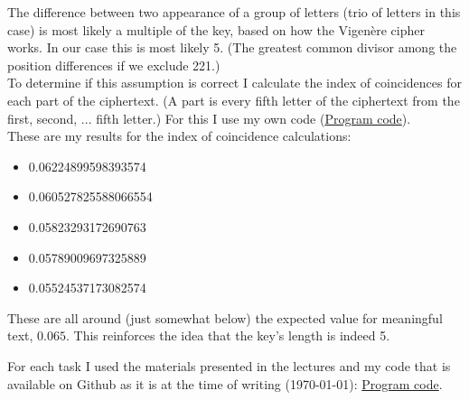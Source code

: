 \documentclass{article}
\begin{document}
\begin{enumerate}[label={}]
\begin{itemize}
		\end{itemize}
		The difference between two appearance of a group of letters (trio of letters in this case) is most likely a multiple of the key, based on how the Vigenère cipher works. In our case this is most likely 5. (The greatest common divisor among the position differences if we exclude 221.)\\
		To determine if this assumption is correct I calculate the index of coincidences for each part of the ciphertext. (A part is every fifth letter of the ciphertext from the first, second, ... fifth letter.) For this I use my own code (\hyperlink{https://github.com/halkszavu/Encryption-Homework-2025/blob/main/Code/Homework-Calculations/Homework-Calculations/Program.cs}{Program code}).\\
		These are my results for the index of coincidence calculations:
		\begin{itemize}		
			 \item  0.06224899598393574
			 \item  0.060527825588066554
			 \item  0.05823293172690763
			 \item  0.05789009697325889
			 \item  0.05524537173082574
		\end{itemize}
		These are all around (just somewhat below) the expected value for meaningful text, $0.065$. This reinforces the idea that the key's length is indeed 5.
\end{enumerate}

For each task I used the materials presented in the lectures and my code that is available on Github as it is at the time of writing (\today): \hyperlink{https://github.com/halkszavu/Encryption-Homework-2025/blob/main/Code/Homework-Calculations/Homework-Calculations/Program.cs}{Program code}.
\end{document}
